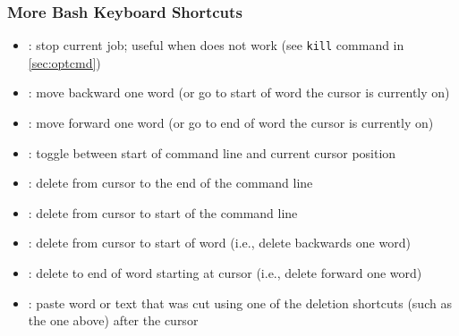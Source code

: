\documentclass[12pt]{article}
\begin{document}
\subsubsection{More Bash Keyboard Shortcuts}
\begin{itemize}
    \item {}: stop current job; useful when  does not work (see \texttt{kill} command in \ref{sec:optcmd})
    \item {}: move backward one word (or go to start of word the cursor is currently on)
    \item {}: move forward one word (or go to end of word the cursor is currently on)
    \item {}: toggle between start of command line and current cursor position
    \item {}: delete from cursor to the end of the command line
    \item {}: delete from cursor to start of the command line
    \item {}: delete from cursor to start of word (i.e., delete backwards one word)
    \item {}: delete to end of word starting at cursor (i.e., delete forward one word)
    \item {}: paste word or text that was cut using one of the deletion shortcuts (such as the one above) after the cursor
\end{itemize}
\end{document}
